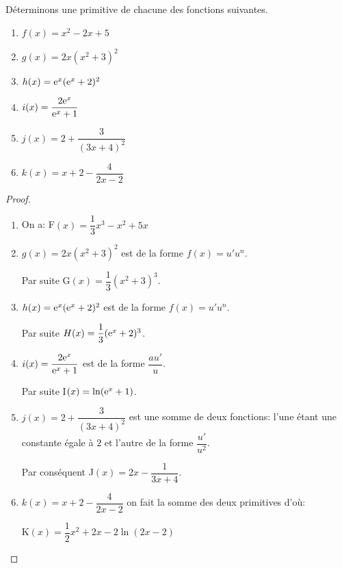 \medskip 
\begin{example}

Déterminons une primitive de chacune des fonctions suivantes.
\begin{enumerate}
\item $ f(x)= x^{2}-2x+5 $
\item  $ g(x)= 2x(x^{2}+3)^{2} $
\item $ h(x)=\mathrm{e}^{x}(\mathrm{e}^{x}+2)^{2} $

\item $ i(x)=\dfrac{2\mathrm{e}^{x}}{\mathrm{e}^{x}+1} $
\item $ j(x)=2+\dfrac{3}{(3x+4)^{2}} $
\item $ k(x)= x + 2-\dfrac{4}{2x-2}$
\end{enumerate}

\end{example}
\begin{proof}
\begin{enumerate}
\item  On a:\; F$(x)= \dfrac{1}{3}x^{3}-x^{2}+5x$
\item  $ g(x)= 2x(x^{2}+3)^{2} $  est de la forme  $f(x)= u'u^{n} $.

 Par suite  G$(x)= \dfrac{1}{3}(x^{2}+3)^{3} $.
\item $ h(x)=\mathrm{e}^{x}(\mathrm{e}^{x}+2)^{2} $ est de la forme  $f(x)= u'u^{n} $.                   

Par suite $ H(x)=\dfrac{1}{3}(\mathrm{e}^{x}+2)^{3} $.
\item $ i(x)=\dfrac{2\mathrm{e}^{x}}{\mathrm{e}^{x}+1} $ est de la forme   $\dfrac{a u'}{u}$.


 Par suite   I$(x)=\ln (\mathrm{e}^{x}+1) $.

\item $ j(x)=2+\dfrac{3}{(3x+4)^{2}} $  est   une somme de deux fonctions:  l'une étant une constante égale à $ 2 $  et l'autre de la forme $ \dfrac{ u'}{u^{2}}$.

Par conséquent  J$(x)=2x-\dfrac{1}{3x+4} $.

\item $ k(x)= x + 2-\dfrac{4}{2x-2}$\;  on fait la somme des deux primitives d'où:

K$(x)= \dfrac{1}{2}x^{2} + 2x-2\ln (2x-2)$
\end{enumerate}
 \end{proof}


